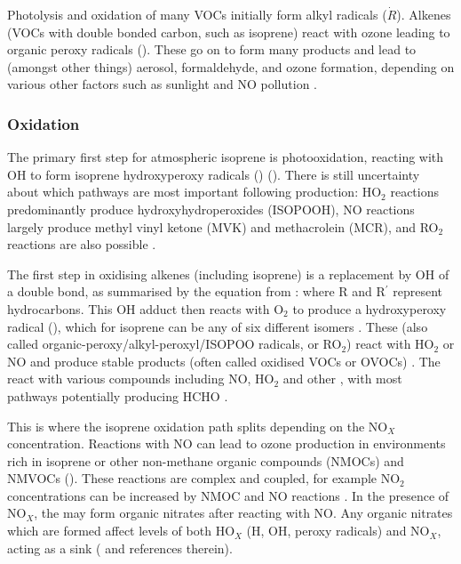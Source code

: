     Photolysis and oxidation of many VOCs initially form alkyl radicals ($\dot{R}$).
    Alkenes (VOCs with double bonded carbon, such as isoprene) react with ozone leading to organic peroxy radicals (\roo). 
    These go on to form many products and lead to (amongst other things) aerosol, formaldehyde, and ozone formation, depending on various other factors such as sunlight and NO pollution \citep{Atkinson2000}.
    
    \subsubsection{Oxidation}
    The primary first step for atmospheric isoprene is photooxidation, reacting with OH to form isoprene hydroxyperoxy radicals (\roo) (\cite{Wolfe2016,Marvin2017,Patchen2017}).
    There is still uncertainty about which pathways are most important following \roo production: HO$_2$ reactions predominantly produce hydroxyhydroperoxides (ISOPOOH), NO reactions largely produce methyl vinyl ketone (MVK) and methacrolein (MCR), and RO$_2$ reactions are also possible \cite{Liu2016a}.
    
    
    The first step in oxidising alkenes (including isoprene) is a replacement by OH of a double bond, as summarised by the equation from \cite{Patchen2007}:
    where R and R$^{\prime}$ represent hydrocarbons.
    This OH adduct then reacts with O$_2$ to produce a hydroxyperoxy radical (\roo), which for isoprene can be any of six different isomers \citep{Patchen2007}.
    These \roo (also called organic-peroxy/alkyl-peroxyl/ISOPOO radicals, or RO$_2$)  react with HO$_2$ or NO and produce stable products (often called oxidised VOCs or OVOCs) \citep{Nguyen2014}.
    The \roo react with various compounds including NO, HO$_2$ and other \roo, with most pathways potentially producing HCHO \citep{Wolfe2016}.
    
    
    This is where the isoprene oxidation path splits depending on the NO$_X$ concentration.
    Reactions with NO can lead to ozone production in environments rich in isoprene or other non-methane organic compounds (NMOCs) and NMVOCs (\cite{Patchen2007,AtkinsonArey2003}).
    These reactions are complex and coupled, for example NO$_2$ concentrations can be increased by NMOC and NO reactions \citep{AtkinsonArey2003}.
    In the presence of NO$_X$, the \roo may form organic nitrates after reacting with NO.
    Any organic nitrates which are formed affect levels of both HO$_X$ (H, OH, peroxy radicals) and NO$_X$, acting as a sink (\cite{Mao2013} and references therein).
    

